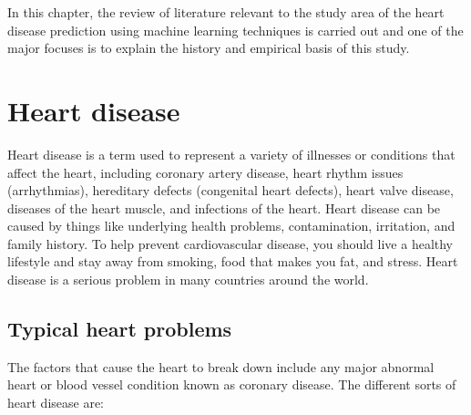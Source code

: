In this chapter, the review of literature relevant to the study area of the heart disease prediction using machine learning techniques is carried out and one of the major focuses is to explain the history and empirical basis of this study.

\section{Heart disease}
Heart disease is a term used to represent a variety of illnesses or conditions that affect the heart, including coronary artery disease, heart rhythm issues (arrhythmias), hereditary defects (congenital heart defects), heart valve disease, diseases of the heart muscle, and infections of the heart. Heart disease can be caused by things like underlying health problems, contamination, irritation, and family history. To help prevent cardiovascular disease, you should live a healthy lifestyle and stay away from smoking, food that makes you fat, and stress. Heart disease is a serious problem in many countries around the world.

\subsection{Typical heart problems}

The factors that cause the heart to break down include any major abnormal heart or blood vessel condition known as coronary disease. The different sorts of heart disease are:

